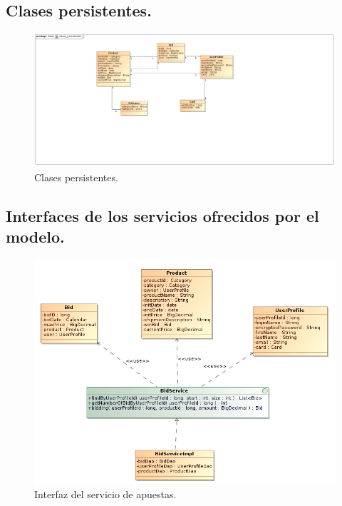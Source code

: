 \documentclass[12pt,a4paper,twoside,spanish]{article}      %
\begin{document}
\subsection{Clases persistentes.}

\begin{figure}[H]
  \centering
    \includegraphics[width=1\textwidth]{clases_persistentes}
  \caption{Clases persistentes.}
  \label{fig:Clases_persistentes}
\end{figure}

\subsection{Interfaces de los servicios ofrecidos por el modelo.}

\begin{figure}[H]
  \centering
    \includegraphics[width=1\textwidth]{BidService}
  \caption{Interfaz del servicio de apuestas.}
  \label{fig:BidService}
\end{figure}
\end{document}
